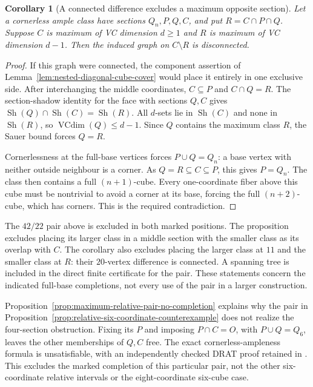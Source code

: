 \documentclass[11pt]{article}
\numberwithin{equation}{section}
\newtheorem{corollary}[theorem]{Corollary}
\theoremstyle{definition}
\theoremstyle{remark}
\begin{document}
\begin{corollary}[A connected difference excludes a maximum opposite section]
\label{cor:connected-maximum-opposite-exclusion}
Let a cornerless ample class have sections $Q_n,P,Q,C$, and put
$R=C\cap P\cap Q$. Suppose $C$ is maximum of VC dimension $d\ge1$
and $R$ is maximum of VC dimension $d-1$. Then the induced graph
on $C\setminus R$ is disconnected.
\end{corollary}
\begin{proof}
If this graph were connected, the component assertion of
Lemma~\ref{lem:nested-diagonal-cube-cover} would place it entirely
in one exclusive side. After interchanging the middle coordinates,
$C\subseteq P$ and $C\cap Q=R$. The section-shadow identity for the
face with sections $Q,C$ gives
$\operatorname{Sh}(Q)\cap\operatorname{Sh}(C)=\operatorname{Sh}(R)$.
All $d$-sets lie in $\operatorname{Sh}(C)$ and none in
$\operatorname{Sh}(R)$, so $\operatorname{VCdim}(Q)\le d-1$.
Since $Q$ contains the maximum class $R$, the Sauer bound forces $Q=R$.

Cornerlessness at the full-base vertices forces $P\cup Q=Q_n$:
a base vertex with neither outside neighbour is a corner. As
$Q=R\subseteq C\subseteq P$, this gives $P=Q_n$.
The class then contains a full $(n+1)$-cube. Every one-coordinate
fiber above this cube must be nontrivial to avoid a corner at its
base, forcing the full $(n+2)$-cube, which has corners. This is the
required contradiction.
\end{proof}

The $42/22$ pair above is excluded in both marked positions. The
proposition excludes placing its larger class in a middle section
with the smaller class as its overlap with $C$. The corollary also
excludes placing the larger class at $11$ and the smaller class at
$R$: their $20$-vertex difference is connected. A spanning tree is
included in the direct finite certificate for the pair. These statements
concern the indicated full-base completions, not every use of the pair
in a larger construction.

Proposition~\ref{prop:maximum-relative-pair-no-completion} explains
why the pair in Proposition~\ref{prop:relative-six-coordinate-counterexample}
does not realize the four-section obstruction. Fixing its $P$
and imposing $P\cap C=O$, with $P\cup Q=Q_6$, leaves the other
memberships of $Q,C$ free. The exact cornerless-ampleness formula is
unsatisfiable, with an independently checked DRAT proof retained in
. This excludes the marked
completion of this particular pair, not the other six-coordinate
relative intervals or the eight-coordinate six-cube case.
\end{document}

